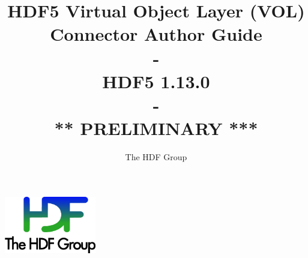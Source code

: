 \documentclass[10pt,a4paper]{article}
\title{HDF5 Virtual Object Layer (VOL) Connector Author Guide\\
    -\\
    \large HDF5 1.13.0\\
    -\\
    \large *** PRELIMINARY ***}
\author{The HDF Group}
\begin{document}
\maketitle
\thispagestyle{empty}

\vfill
\begin{center}
\includegraphics[width=4cm]{THG_LOGO.pdf} %
\end{center}
\vfill
\vfill

\newpage
{}
\tableofcontents
\newpage


\renewcommand\appendixtocname{Appendix}







\end{document}
